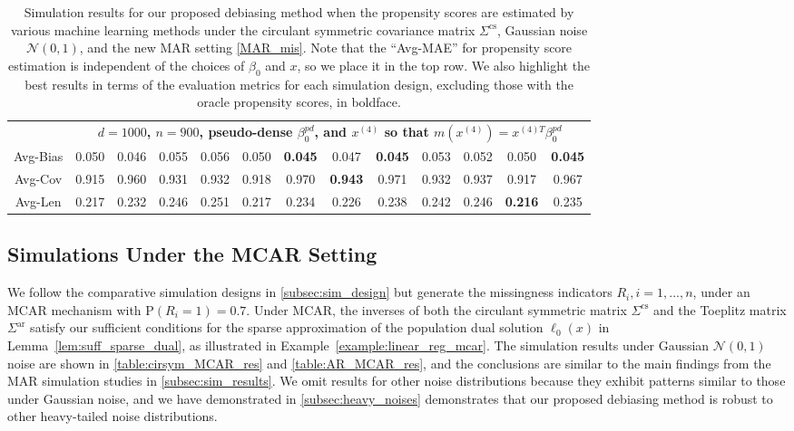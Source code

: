 \documentclass[ejsv2,noshowframe]{imsart}
\theoremstyle{plain}
\theoremstyle{definition}
\theoremstyle{remark}
\begin{document}
\begin{table}[hbtp!]
\begin{center}
{\begin{tabular}{ccccccccccccc}
				& \multicolumn{12}{c}{\bf $d=1000$, $n = 900$, pseudo-dense $\beta_0^{pd}$, and $x^{(4)}$ so that $m(x^{(4)})=x^{(4)T}\beta_0^{pd}$} \\ \cline{2-13}
				Avg-Bias & 0.050 & 0.046 & 0.055 & 0.056 & 0.050 & {\bf 0.045} & 0.047 & {\bf 0.045} & 0.053 & 0.052 & 0.050 & {\bf 0.045} \\
				Avg-Cov & 0.915 & 0.960 & 0.931 & 0.932 & 0.918 & 0.970 & {\bf 0.943} & 0.971 & 0.932 & 0.937 & 0.917 & 0.967 \\
				Avg-Len & 0.217 & 0.232 & 0.246 & 0.251 & 0.217 & 0.234 & 0.226 & 0.238 & 0.242 & 0.246 & {\bf 0.216} & 0.235 \\
				\hline\hline
		\end{tabular}}
		\caption{Simulation results for our proposed debiasing method when the propensity scores are estimated by various machine learning methods under the circulant symmetric covariance matrix $\Sigma^{\mathrm{cs}}$, Gaussian noise $\mathcal{N}(0,1)$, and the new MAR setting \eqref{MAR_mis}. Note that the ``Avg-MAE'' for propensity score estimation is independent of the choices of $\beta_0$ and $x$, so we place it in the top row. We also highlight the best results in terms of the evaluation metrics for each simulation design, excluding those with the oracle propensity scores, in boldface.}
		\label{table:CirSym_MAR_Non_Prop_Score}
	\end{center}
\end{table}


\subsection{Simulations Under the MCAR Setting}
\label{subapp:mcar_res}

We follow the comparative simulation designs in \autoref{subsec:sim_design} but generate the missingness indicators $R_i, i=1,...,n$, under an MCAR mechanism with $\mathrm{P}(R_i=1)=0.7$. Under MCAR, the inverses of both the circulant symmetric matrix $\Sigma^{\mathrm{cs}}$ and the Toeplitz matrix $\Sigma^{\mathrm{ar}}$ satisfy our sufficient conditions for the sparse approximation of the population dual solution $\ell_0(x)$ in Lemma~\ref{lem:suff_sparse_dual}, as illustrated in Example~\ref{example:linear_reg_mcar}. The simulation results under Gaussian $\mathcal{N}(0,1)$ noise are shown in \autoref{table:cirsym_MCAR_res} and \autoref{table:AR_MCAR_res}, and the conclusions are similar to the main findings from the MAR simulation studies in \autoref{subsec:sim_results}. We omit results for other noise distributions because they exhibit patterns similar to those under Gaussian noise, and we have demonstrated in \autoref{subsec:heavy_noises} demonstrates that our proposed debiasing method is robust to other heavy-tailed noise distributions.
\end{document}
